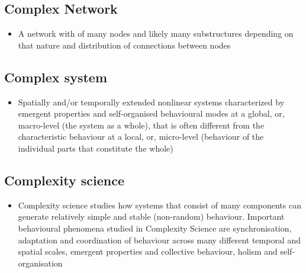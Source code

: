 \documentclass[12pt,]{book}
\providecommand{\tightlist}{%
  \setlength{\itemsep}{0pt}\setlength{\parskip}{0pt}}
\begin{document}
\hypertarget{Comp10}{%
\subsection*{\texorpdfstring{\textbf{Complex Network}}{Complex Network}}\label{Comp10}}

\begin{itemize}
\tightlist
\item
  A network with of many nodes and likely many substructures depending on that nature and distribution of connections between nodes
\end{itemize}

\hypertarget{Comp11}{%
\subsection*{\texorpdfstring{\textbf{Complex system}}{Complex system}}\label{Comp11}}

\begin{itemize}
\tightlist
\item
  Spatially and/or temporally extended nonlinear systems characterized by emergent properties and self-organised behavioural modes at a global, or, macro-level (the system as a whole), that is often different from the characteristic behaviour at a local, or, micro-level (behaviour of the individual parts that constitute the whole)
\end{itemize}

\hypertarget{Comp12}{%
\subsection*{\texorpdfstring{\textbf{Complexity science}}{Complexity science}}\label{Comp12}}

\begin{itemize}
\tightlist
\item
  Complexity science studies how systems that consist of many components can generate relatively simple and stable (non-random) behaviour. Important behavioural phenomena studied in Complexity Science are synchronisation, adaptation and coordination of behaviour across many different temporal and spatial scales, emergent properties and collective behaviour, holism and self-organisation
\end{itemize}
\end{document}
